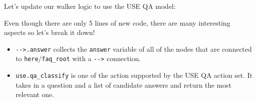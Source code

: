Let's update our walker logic to use the USE QA model:

\begin{Shaded}
    \begin{Highlighting}[]
        \OperatorTok{\{}
        \OperatorTok{;}
        \OperatorTok{\{}
        \OperatorTok{=} \NormalTok{(}\NormalTok{)}\OperatorTok{;}
        \OperatorTok{-->} \OperatorTok{::}\OperatorTok{;}
        \OperatorTok{\}}
        \OperatorTok{\{}
        \OperatorTok{=} \OperatorTok{-->}\OperatorTok{;}
        \OperatorTok{=} \NormalTok{(}
        \OperatorTok{=}\OperatorTok{,}
        \OperatorTok{=}
        \NormalTok{        )}\OperatorTok{;}
        \OperatorTok{-->} \OperatorTok{::}\OperatorTok{==}\NormalTok{best_answer[}\NormalTok{])}\OperatorTok{;}
        \OperatorTok{\}}
        \OperatorTok{\{}
        \NormalTok{(}\NormalTok{)}\OperatorTok{;}
        \OperatorTok{\}}
        \OperatorTok{\}}
    \end{Highlighting}
\end{Shaded}

Even though there are only 5 lines of new code, there are many
interesting aspects so let's break it down!

\begin{itemize}
    \tightlist
    \item
          \texttt{-\/-\textgreater{}.answer} collects the \texttt{answer}
          variable of all of the nodes that are connected to
          \texttt{here}/\texttt{faq\_root} with a \texttt{-\/-\textgreater{}}
          connection.
    \item
          \texttt{use.qa\_classify} is one of the action supported by the USE QA
          action set. It takes in a question and a list of candidate answers and
          return the most relevant one.
\end{itemize}

